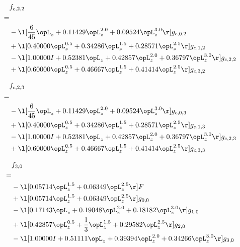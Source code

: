 \begin{alignat}{2} 
\label{eq:f_22_0} 
& f_{c,2,2} \nonumber \\ 
 = \\ 
& - \l[ \frac{6}{45} \opL_z +  0.11429 \opL_z^{2.0} +  0.09524 \opL_z^{3.0}  \r] g_{c,0,2} \nonumber \\ 
& + \l[  0.40000 \opL_z^{0.5} +  0.34286 \opL_z^{1.5} +  0.28571 \opL_z^{2.5}  \r] g_{c,1,2} \nonumber \\ 
& - \l[  1.00000 I +  0.52381 \opL_z +  0.42857 \opL_z^{2.0} +  0.36797 \opL_z^{3.0}  \r] g_{c,2,2} \nonumber \\ 
& + \l[  0.60000 \opL_z^{0.5} +  0.46667 \opL_z^{1.5} +  0.41414 \opL_z^{2.5}  \r] g_{c,3,2} \nonumber \\ 
\end{alignat} 


\begin{alignat}{2} 
\label{eq:f_23_0} 
& f_{c,2,3} \nonumber \\ 
 = \\ 
& - \l[ \frac{6}{45} \opL_z +  0.11429 \opL_z^{2.0} +  0.09524 \opL_z^{3.0}  \r] g_{c,0,3} \nonumber \\ 
& + \l[  0.40000 \opL_z^{0.5} +  0.34286 \opL_z^{1.5} +  0.28571 \opL_z^{2.5}  \r] g_{c,1,3} \nonumber \\ 
& - \l[  1.00000 I +  0.52381 \opL_z +  0.42857 \opL_z^{2.0} +  0.36797 \opL_z^{3.0}  \r] g_{c,2,3} \nonumber \\ 
& + \l[  0.60000 \opL_z^{0.5} +  0.46667 \opL_z^{1.5} +  0.41414 \opL_z^{2.5}  \r] g_{c,3,3} \nonumber \\ 
\end{alignat} 


\begin{alignat}{2} 
\label{eq:f_30_0} 
& f_{3,0} \nonumber \\ 
 = \\ 
& - \l[  0.05714 \opL_z^{1.5} +  0.06349 \opL_z^{2.5}  \r] F \nonumber \\ 
& + \l[  0.05714 \opL_z^{1.5} +  0.06349 \opL_z^{2.5}  \r] g_{0,0} \nonumber \\ 
& - \l[  0.17143 \opL_z +  0.19048 \opL_z^{2.0} +  0.18182 \opL_z^{3.0}  \r] g_{1,0} \nonumber \\ 
& + \l[  0.42857 \opL_z^{0.5} + \frac{1}{3} \opL_z^{1.5} +  0.29582 \opL_z^{2.5}  \r] g_{2,0} \nonumber \\ 
& - \l[  1.00000 I +  0.51111 \opL_z +  0.39394 \opL_z^{2.0} +  0.34266 \opL_z^{3.0}  \r] g_{3,0} \nonumber \\ 
\end{alignat} 


